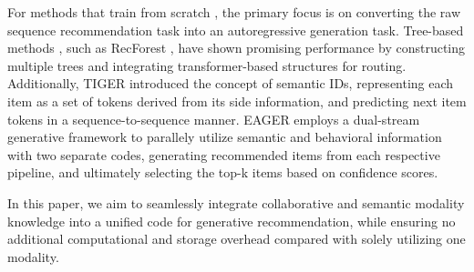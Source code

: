 For methods that train from scratch \cite{zeng2024scalable, wang2024enhanced, liu2024mmgrec, feng2022recommender, rajput2023recommender, wang2024eager, zhu2018learning, zhu2019joint}, the primary focus is on converting the raw sequence recommendation task into an autoregressive generation task. Tree-based methods \cite{zhu2018learning, feng2022recommender, zhu2019joint}, such as RecForest  \cite{feng2022recommender}, have shown promising performance by constructing multiple trees and integrating transformer-based structures for routing. Additionally, TIGER \cite{rajput2023recommender} introduced the concept of semantic IDs, representing each item as a set of tokens derived from its side information, and predicting next item tokens in a sequence-to-sequence manner. EAGER \cite{wang2024eager} employs a dual-stream generative framework to parallely utilize semantic and behavioral information with two separate codes, generating recommended items from each respective pipeline, and ultimately selecting the top-k items based on confidence scores. 

In this paper, we aim to seamlessly integrate collaborative and semantic modality knowledge into a unified code for generative recommendation, while ensuring no additional computational and storage overhead compared with solely utilizing one modality.